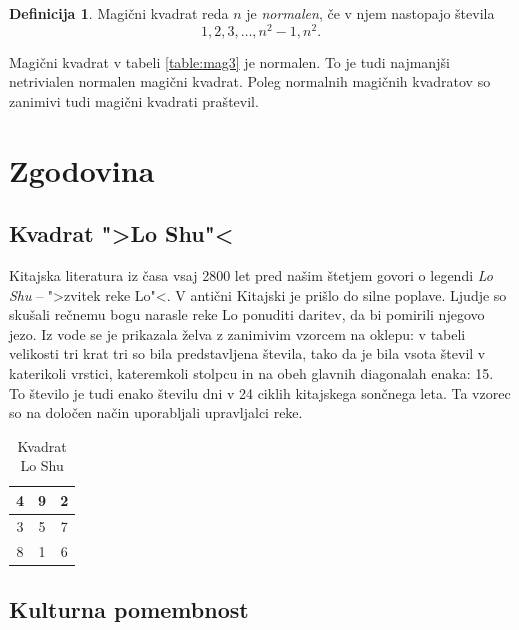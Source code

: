 \documentclass[a4paper,12pt]{article}
\newcommand{\pojem}[1]{\emph{\color{purple}#1}}
\theoremstyle{definition}
\newtheorem{definicija}{Definicija}
\theoremstyle{plain}
\newenvironment{magic}[3]
{\begin{table}[!ht]
   \centering
   \caption{#2}
   \label{#3}
   \large
   \begin{tabular}{|*{#1}{c|}}
   \hline
   }
{\end{tabular}
   \normalsize
\end{table}}
\begin{document}
\begin{definicija}
   Magični kvadrat reda \(n\) je \pojem{normalen}, če v njem nastopajo števila
   \begin{equation}
      \label{eq:numbers}
      1, 2, 3, \ldots, n^2-1, n^2.
   \end{equation}
\end{definicija}

Magični kvadrat v tabeli \ref{table:mag3} je normalen.
To je tudi najmanjši netrivialen normalen magični kvadrat.
Poleg normalnih magičnih kvadratov so zanimivi tudi magični kvadrati praštevil.


\section{Zgodovina}

\subsection{Kvadrat ">Lo Shu"<}

Kitajska literatura iz časa vsaj 2800 let pred našim štetjem govori o legendi
\emph{Lo Shu} -- ">zvitek reke Lo"<. V antični Kitajski je prišlo do
silne poplave. Ljudje so skušali rečnemu bogu narasle reke Lo ponuditi daritev,
da bi pomirili njegovo jezo. Iz vode se je prikazala želva z zanimivim vzorcem
na oklepu: v tabeli velikosti tri krat tri so bila predstavljena števila, tako
da je bila vsota števil v katerikoli vrstici, kateremkoli stolpcu in na obeh
glavnih diagonalah enaka: 15. To število je tudi enako številu dni v 24 ciklih
kitajskega sončnega leta. Ta vzorec so na določen način uporabljali upravljalci
reke.

\begin{magic}{3}{Kvadrat Lo Shu}{table:loshu}
   4 & 9 & 2 \\\hline
   3 & 5 & 7 \\\hline
   8 & 1 & 6 \\\hline
\end{magic}


\subsection{Kulturna pomembnost}
\end{document}
